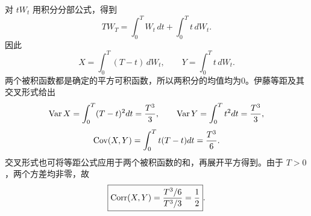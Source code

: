 对 $tW_t$ 用积分分部公式，得到
\[
 TW_T=\int_0^T W_t\,dt+\int_0^T t\,dW_t.
\]
因此
\[
 X=\int_0^T(T-t)\,dW_t,\qquad
 Y=\int_0^T t\,dW_t.
\]
两个被积函数都是确定的平方可积函数，所以两积分的均值均为0。伊藤等距及其交叉形式给出
\[
 \operatorname{Var} X=\int_0^T(T-t)^2dt=\frac{T^3}{3},\qquad
 \operatorname{Var} Y=\int_0^Tt^2dt=\frac{T^3}{3},
\]
\[
 \operatorname{Cov}(X,Y)=\int_0^Tt(T-t)dt=\frac{T^3}{6}.
\]
交叉形式也可将等距公式应用于两个被积函数的和，再展开平方得到。由于 $T>0$，两个方差均非零，故
\[
 \boxed{\operatorname{Corr}(X,Y)=\frac{T^3/6}{T^3/3}=\frac12}.
\]
